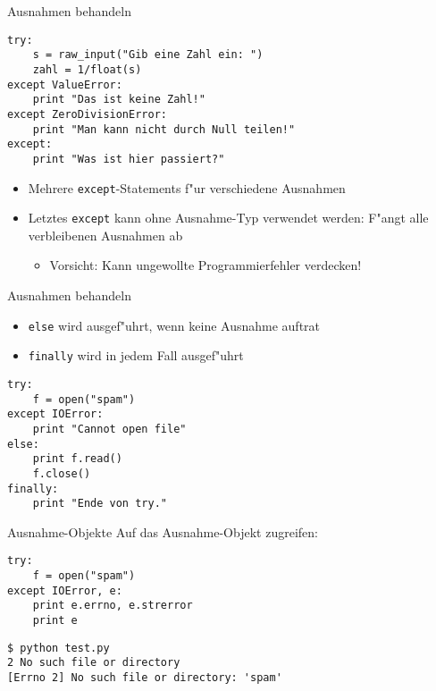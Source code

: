 \begin{frame}[fragile]{Ausnahmen behandeln}
\begin{lstlisting}[style=Python]
try:
    s = raw_input("Gib eine Zahl ein: ")
    zahl = 1/float(s)
except ValueError:
    print "Das ist keine Zahl!"
except ZeroDivisionError:
    print "Man kann nicht durch Null teilen!"
except:
    print "Was ist hier passiert?"
\end{lstlisting}
\begin{itemize}
\item Mehrere \lstinline{except}-Statements f"ur verschiedene Ausnahmen
\item Letztes \lstinline{except} kann ohne Ausnahme-Typ verwendet werden: F"angt alle verbleibenen Ausnahmen ab
\begin{itemize}
\item Vorsicht: Kann ungewollte Programmierfehler verdecken!
\end{itemize}
\end{itemize}
\end{frame}

\begin{frame}[fragile]{Ausnahmen behandeln}
\begin{itemize}
\item \alert{\texttt{else}} wird ausgef"uhrt, wenn keine Ausnahme auftrat
\item \alert{\texttt{finally}} wird in \alert{jedem} Fall ausgef"uhrt
\end{itemize}
\begin{lstlisting}[style=Python]
try:
    f = open("spam")
except IOError:
    print "Cannot open file"
else:
    print f.read()
    f.close()
finally:
    print "Ende von try."
\end{lstlisting}
\end{frame}

\begin{frame}[fragile]{Ausnahme-Objekte}
Auf das Ausnahme-Objekt zugreifen:
\begin{lstlisting}[style=Python]
try:
    f = open("spam")
except IOError, e:
    print e.errno, e.strerror
    print e
\end{lstlisting}
\begin{lstlisting}[style=Shell]
$ python test.py
2 No such file or directory
[Errno 2] No such file or directory: 'spam'
\end{lstlisting}%
\end{frame}

